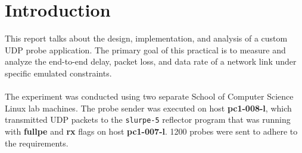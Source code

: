 \section{Introduction}

This report talks about the design, implementation, and analysis of a custom UDP probe application. The primary goal of this practical is to measure and analyze the end-to-end delay, packet loss, and data rate of a network link under specific emulated constraints.
\\\\
The experiment was conducted using two separate School of Computer Science Linux lab machines. The probe sender was executed on host \textbf{pc1-008-l}, which transmitted UDP packets to the \texttt{slurpe-5} reflector program that was running with \textbf{fullpe} and \textbf{rx} flags on host \textbf{pc1-007-l}. 1200 probes were sent to adhere to the requirements.